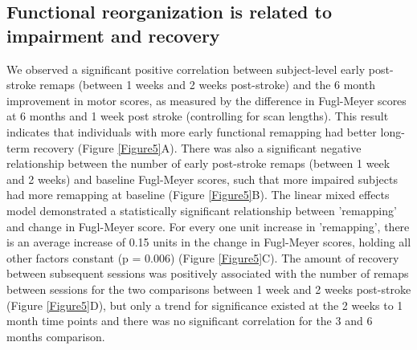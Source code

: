 \documentclass[phd,tocprelim]{cornell}
\begin{document}
	\subsection{Functional reorganization is related to impairment and recovery}
	We observed a significant positive correlation between subject-level early post-stroke remaps (between 1 weeks and 2 weeks post-stroke) and the 6 month improvement in motor scores, as measured by the difference in Fugl-Meyer scores at 6 months and 1 week post stroke (controlling for scan lengths). This result indicates that individuals with more early functional remapping had better long-term recovery (Figure \ref{Figure5}A). There was also a significant negative relationship between the number of early post-stroke remaps (between 1 week and 2 weeks) and baseline Fugl-Meyer scores, such that more impaired subjects had more remapping at baseline (Figure \ref{Figure5}B). The linear mixed effects model demonstrated a statistically significant relationship between 'remapping' and change in Fugl-Meyer score. For every one unit increase in 'remapping', there is an average increase of 0.15 units in the change in Fugl-Meyer scores, holding all other factors constant (p = 0.006) (Figure \ref{Figure5}C). The amount of recovery between subsequent sessions was  positively associated with the number of remaps between sessions for the two comparisons between 1 week and 2 weeks post-stroke (Figure \ref{Figure5}D), but only a trend for significance existed at the 2 weeks to 1 month time points and there was no significant correlation for the 3 and 6 months comparison.
	
\end{document}

